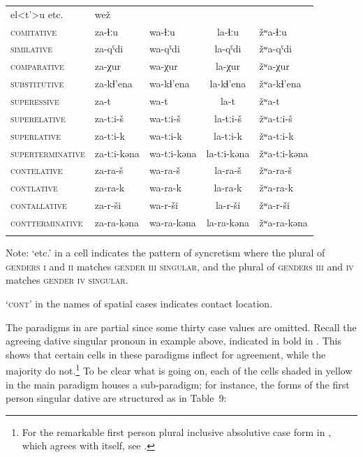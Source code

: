 \documentclass[output=paper]{langscibook}
\begin{document}
\begin{tabularx}{\textwidth}{XXXXXX}
el<t’>u     etc. & wež \\
\textsc{comitative} & za-ɬːu & wa-ɬːu & \multicolumn{2}{c}{la-ɬːu}  & žʷa-ɬːu \\
\textsc{similative}  & za-qˤdi & wa-qˤdi & \multicolumn{2}{c}{la-qˤdi}  & žʷa-qˤdi \\
\textsc{comparative}  & za-χur & wa-χur & \multicolumn{2}{c}{la-χur}  & žʷa-χur \\
\textsc{substitutive}  & za-kɬ’ena & wa-kɬ’ena & \multicolumn{2}{c}{la-kɬ’ena}  & žʷa-kɬ’ena \\
\textsc{superessive}  & za-t & wa-t & \multicolumn{2}{c}{la-t}  & žʷa-t \\
\textsc{superelative}  & za-tːi-š & wa-tːi-š & \multicolumn{2}{c}{la-tːi-š}  & žʷa-tːi-š \\
\textsc{superlative}  & za-tːi-k & wa-tːi-k & \multicolumn{2}{c}{la-tːi-k}  & žʷa-tːi-k \\
\textsc{superterminative}  & za-tːi-kǝna & wa-tːi-kǝna & \multicolumn{2}{c}{la-tːi-kǝna}  & žʷa-tːi-kǝna \\
\textsc{contelative} & za-ra-š & wa-ra-š & \multicolumn{2}{c}{la-ra-š}  & žʷa-ra-š \\
\textsc{contlative}  & za-ra-k & wa-ra-k & \multicolumn{2}{c}{la-ra-k}  & žʷa-ra-k \\
\textsc{contallative} & za-r-ši & wa-r-ši & \multicolumn{2}{c}{la-r-ši}  & žʷa-r-ši \\
\textsc{contterminative}  & za-ra-kǝna & wa-ra-kǝna & \multicolumn{2}{c}{la-ra-kǝna}  & žʷa-ra-kǝna \\
\lspbottomrule
\end{tabularx}
\begin{table}
\caption{Archi personal pronouns (partial paradigms), based on \citet[257-260]{Kibrik1977} and Chumakina \& \citet[102]{Corbett2015}}
\label{tab:key:8}
\end{table}

Note:   ‘etc.’ in a cell indicates the pattern of syncretism where the plural of \textsc{genders} \textsc{i} and \textsc{ii} matches \textsc{gender} \textsc{iii} \textsc{singular}, and the plural of \textsc{genders} \textsc{iii} and \textsc{iv} matches \textsc{gender} \textsc{iv} \textsc{singular.} 

  ‘\textsc{cont’} in the names of spatial cases indicates contact location.

The paradigms in  are partial since some thirty case values are omitted. Recall the agreeing dative singular pronoun in example  above, indicated in bold in . This shows that certain cells in these paradigms inflect for agreement, while the majority do not.\footnote{ \textrm{For the remarkable first person plural inclusive absolutive case form in , which agrees with itself, see \citet[68-69]{Corbett2006}.}} To be clear what is going on, each of the cells shaded in yellow in the main paradigm houses a sub\nobreakdash-paradigm; for instance, the forms of the first person singular dative are structured as in Table~9:
\end{document}
